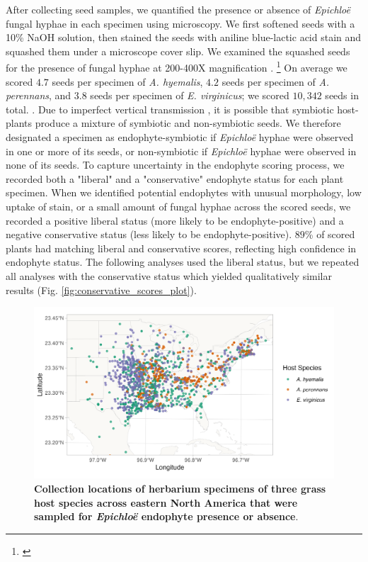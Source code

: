 \documentclass[11pt]{article}
\let\cite\citep
\newcommand{\tom}[2]{{\color{red}{#1}}\footnote{\textit{\color{red}{#2}}}}
\begin{document}
After collecting seed samples, we quantified the presence or absence of \emph{Epichloë} fungal hyphae in each specimen using microscopy. 
We first softened seeds with a 10\% NaOH solution, then stained the seeds with aniline blue-lactic acid stain and squashed them under a microscope cover slip. 
We examined the squashed seeds for the presence of fungal hyphae at 200-400X magnification \cite{bacon2018stains}.
\tom{In some cases, the tissues examined during microscopy came from flowers or otherwise non-viable seeds, which were excluded for that specimen.}{Could cut, since you already say you only took good seeds.}
On average we scored $4.7$ seeds per specimen of \emph{A. hyemalis}, $4.2$ seeds per specimen of \emph{A. perennans}, and $3.8$ seeds per specimen of \emph{E. virginicus}; we scored $10,342$ seeds in total. .
Due to imperfect vertical transmission \cite{afkhami2008symbiosis}, it is possible that symbiotic host-plants produce a mixture of symbiotic and non-symbiotic seeds. 
We therefore designated a specimen as endophyte-symbiotic if \emph{Epichloë} hyphae were observed in one or more of its seeds, or non-symbiotic if \emph{Epichloë} hyphae were observed in none of its seeds. 
To capture uncertainty in the endophyte scoring process, we recorded both a "liberal" and a "conservative" endophyte status for each plant specimen.  
When we identified potential endophytes with unusual morphology, low uptake of stain, or a small amount of fungal hyphae across the scored seeds, we recorded a positive liberal status (more likely to be endophyte-positive) and a negative conservative status (less likely to be endophyte-positive). 
$89$\% of scored plants had matching liberal and conservative scores, reflecting high confidence in endophyte status.
The following analyses used the liberal status, but we repeated all analyses with the conservative status which yielded qualitatively similar results (Fig. \ref{fig:conservative_scores_plot}).

\begin{figure}[h]
	\centering
	\includegraphics[width = \linewidth]{../Plots/collections_map.png}
	\caption{\textbf{Collection locations of herbarium specimens of three grass host species across eastern North America that were sampled for \emph{Epichloë} endophyte presence or absence}.}
	\label{fig:map}
\end{figure}
\end{document}
